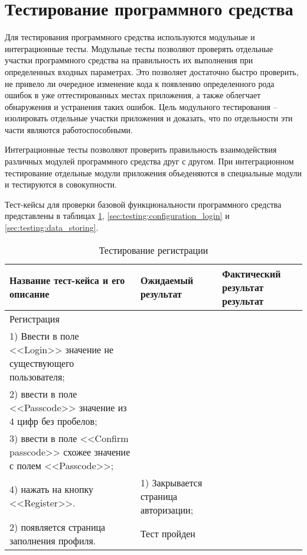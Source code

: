 \section{Тестирование программного средства}
\label{sec:testing}

Для тестирования программного средства используются модульные и интеграционные тесты. Модульные тесты позволяют проверять отдельные участки программного средства на правильность их выполнения при определенных входных параметрах. Это позволяет достаточно быстро проверить, не привело ли очередное изменение кода к появлению определенного рода ошибок в уже оттестированных местах приложения, а также облегчает обнаружения и устранения таких ошибок. Цель модульного тестирования -- изолировать отдельные участки приложения и доказать, что по отдельности эти части являются работоспособными. 

Интеграционные тесты позволяют проверить правильность взаимодействия различных модулей программного средства друг с другом. При интеграционном тестирование отдельные модули приложения объеденяются в специальные модули и тестируются в совокупности.

Тест-кейсы для проверки базовой функциональности программного средства представлены в таблицах \ref{sec:testing:configuration_register}, \ref{sec:testing:configuration_login}  и \ref{sec:testing:data_storing}.

\begin{longtable}[l]{| >{\raggedright}p{}
                     | >{\raggedright}p{}
                     | >{\raggedright\arraybackslash}p{}|}
  \caption{Тестирование регистрации}
  \label{sec:testing:configuration_register} \tabularnewline

  \hline
       Название тест-кейса и его описание & Ожидаемый результат & Фактический результат результат \\
   \hline
   Регистрация\\ 
   1) Ввести в поле <<Login>> значение не существующего пользователя; \\
   2) ввести в поле <<Passcode>> значение из 4 цифр без пробелов; \\  
   3) ввести в поле <<Confirm passcode>> схожее значение с полем <<Passcode>>; \\ 
   4) нажать на кнопку <<Register>>.

   &
   1) Закрывается страница авторизации; \\
   2) появляется страница заполнения профиля.

   & Тест пройден \\
   \hline
\end{longtable}

